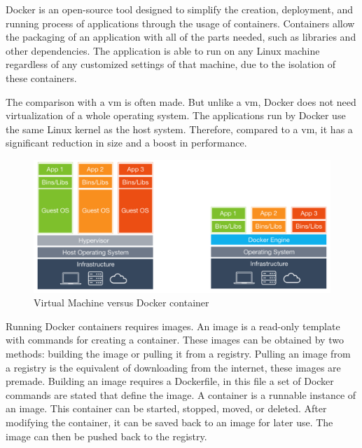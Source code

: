 Docker is an open\hyp{}source tool designed to simplify the creation, deployment, and running process of applications through the usage of containers. Containers allow the packaging of an application with all of the parts needed, such as libraries and other dependencies. The application is able to run on any Linux machine regardless of any customized settings of that machine, due to the isolation of these containers. \cite{opensource_what_is_docker}

The comparison with a \ac{vm} is often made. But unlike a \acs{vm}, Docker does not need virtualization of a whole operating system. The applications run by Docker use the same Linux kernel as the host system. Therefore, compared to a \acs{vm}, it has a significant reduction in size and a boost in performance. \cite{opensource_what_is_docker}

\begin{figure}[!h]
  \centering
  \includegraphics[width=0.7\linewidth]{images/vm_vs_container.png}
  \caption{Virtual Machine versus Docker container \cite{docker_101}}
  \label{fig:vm_vs_container}
\end{figure}

Running Docker containers requires images. An image is a read\hyp{}only template with commands for creating a container. These images can be obtained by two methods: building the image or pulling it from a registry. Pulling an image from a registry is the equivalent of downloading from the internet, these images are premade. Building an image requires a Dockerfile, in this file a set of Docker commands are stated that define the image. A container is a runnable instance of an image. This container can be started, stopped, moved, or deleted. After modifying the container, it can be saved back to an image for later use. The image can then be pushed back to the registry. \cite{docker_get_started_overview}


